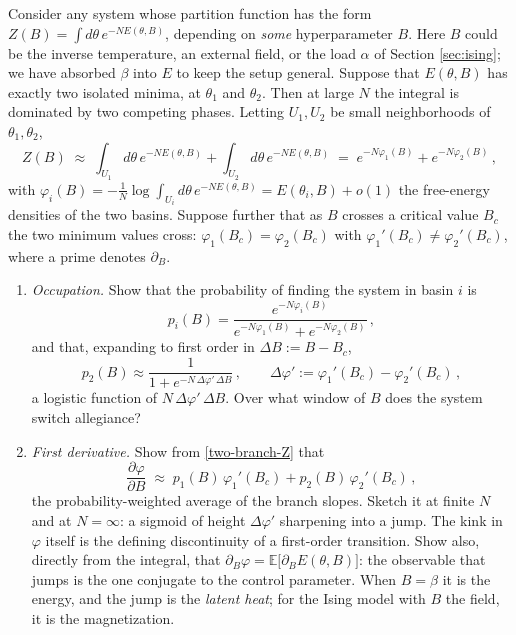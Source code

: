 \documentclass[11pt]{article}
\newcommand{\E}{\mathbb{E}}
\newcommand{\pd}{\partial}
\begin{document}
\begin{exercise}
\label{ex:anatomy}
\important
Consider any system whose partition function has the form $Z(B) = \int d\theta\, e^{-N E(\theta,B)}$, depending on \emph{some} hyperparameter $B$. Here $B$ could be the inverse temperature, an external field, or the load $\alpha$ of Section \ref{sec:ising}; we have absorbed $\beta$ into $E$ to keep the setup general. Suppose that $E(\theta,B)$ has exactly two isolated minima, at $\theta_1$ and $\theta_2$. Then at large $N$ the integral is dominated by two competing phases. Letting $U_1,U_2$ be small neighborhoods of $\theta_1,\theta_2$,
%
\begin{equation}
    Z(B) \;\approx\; \int_{U_1} d\theta\,e^{-N E(\theta,B)} + \int_{U_2} d\theta\,e^{-N E(\theta,B)} \;=\; e^{-N\varphi_1(B)} + e^{-N\varphi_2(B)}\,, \label{two-branch-Z}
\end{equation}
%
with $\varphi_i(B) = -\frac{1}{N}\log\int_{U_i}d\theta\,e^{-NE(\theta,B)} = E(\theta_i,B) + o(1)$ the free-energy densities of the two basins. Suppose further that as $B$ crosses a critical value $B_c$ the two minimum values cross: $\varphi_1(B_c) = \varphi_2(B_c)$ with $\varphi_1'(B_c)\neq\varphi_2'(B_c)$, where a prime denotes $\pd_B$.
\begin{enumerate}
    \item \emph{Occupation.} Show that the probability of finding the system in basin $i$ is
    \begin{equation}
        p_i(B) = \frac{e^{-N\varphi_i(B)}}{e^{-N\varphi_1(B)}+e^{-N\varphi_2(B)}}\,, \label{p-weights}
    \end{equation}
    and that, expanding to first order in $\Delta B := B - B_c$,
    \begin{equation}
        p_2(B) \approx \frac{1}{1+e^{-N\,\Delta\varphi'\,\Delta B}}\,,\qquad \Delta\varphi' := \varphi_1'(B_c) - \varphi_2'(B_c)\,, \label{p-logistic}
    \end{equation}
    a logistic function of $N\,\Delta\varphi'\,\Delta B$. Over what window of $B$ does the system switch allegiance?
    \item \emph{First derivative.} Show from \eqref{two-branch-Z} that
    \begin{equation} \label{dF-sigmoid}
        \frac{\pd\varphi}{\pd B} \;\approx\; p_1(B)\,\varphi_1'(B_c) + p_2(B)\,\varphi_2'(B_c)\,,
    \end{equation}
    the probability-weighted average of the branch slopes. Sketch it at finite $N$ and at $N=\infty$: a sigmoid of height $\Delta\varphi'$ sharpening into a jump. The kink in $\varphi$ itself is the defining discontinuity of a first-order transition. Show also, directly from the integral, that $\pd_B\varphi = \E\big[\pd_B E(\theta,B)\big]$: the observable that jumps is the one conjugate to the control parameter. When $B=\beta$ it is the energy, and the jump is the \emph{latent heat}; for the Ising model with $B$ the field, it is the magnetization.

\end{enumerate}
\end{exercise}
\end{document}
